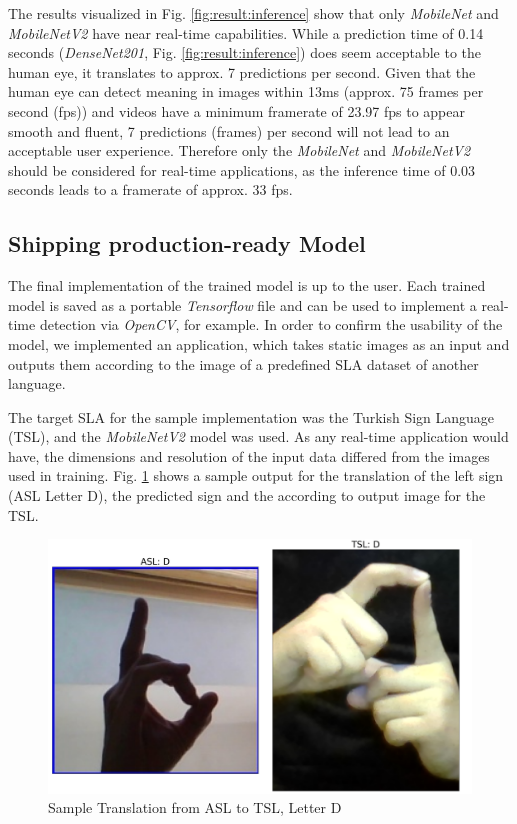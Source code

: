 The results visualized in Fig. \ref{fig:result:inference} show that only \textit{MobileNet} and \textit{MobileNetV2} have near real-time capabilities. While a prediction time of 0.14 seconds (\textit{DenseNet201}, Fig. \ref{fig:result:inference}) does seem acceptable to the human eye, it translates to approx. 7 predictions per second. Given that the human eye can detect meaning in images within 13ms\cite{Potter2014} (approx. 75 frames per second (fps)) and videos have a minimum framerate of 23.97 fps to appear smooth and fluent, 7 predictions (frames) per second will not lead to an acceptable user experience. Therefore only the \textit{MobileNet} and \textit{MobileNetV2} should be considered for real-time applications, as the inference time of 0.03 seconds leads to a framerate of approx. 33 fps.

\subsection{Shipping production-ready Model}
The final implementation of the trained model is up to the user. Each trained model is saved as a portable \textit{Tensorflow} file and can be used to implement a real-time detection via \textit{OpenCV}, for example. In order to confirm the usability of the model, we implemented an application, which takes static images as an input and outputs them according to the image of a predefined SLA dataset of another language. 

The target SLA for the sample implementation was the Turkish Sign Language (TSL), and the \textit{MobileNetV2} model was used. As any real-time application would have, the dimensions and resolution of the input data differed from the images used in training. Fig. \ref{fig:result:translation} shows a sample output for the translation of the left sign (ASL Letter D), the predicted sign and the according to output image for the TSL.

\begin{figure}[h]
    \centering
    \caption{Sample Translation from ASL to TSL, Letter D}
	\label{fig:result:translation}
    \includegraphics[width=\linewidth]{figures/sample_translate_D_tur.png}
\end{figure}